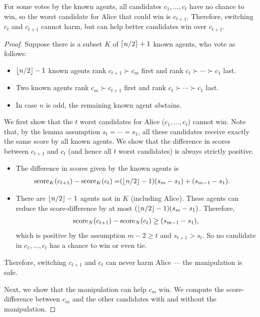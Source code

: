 \begin{proofsketch}
For some votes by the known agents,
all candidates $c_1,\ldots,c_t$ have no chance to win, 
so the worst candidate for Alice that could win is $c_{t+1}$.
Therefore, switching $c_t$ and $c_{t+1}$ cannot harm, but can help better candidates win over $c_{t+1}$.
\end{proofsketch}
\begin{proof}
Suppose there is a subset $K$ of $\left\lceil n/2 \right\rceil+1$ known agents, who vote as follows:
\begin{itemize}
\item $\left\lfloor n/2 \right\rfloor-1$ known agents rank $c_{t+1} \succ c_m$ first and rank $c_t \succ \cdots \succ c_1$ last.
\item Two known agents rank $c_m \succ c_{t+1}$ first and rank $c_t \succ \cdots \succ c_1$ last.
\item In case $n$ is odd, the remaining known agent abstains.
\end{itemize}
We first show that the $t$ worst candidates for Alice ($c_1,\ldots, c_t$) cannot win. 
Note that, by the lemma assumption $s_t = \cdots = s_1$, all these candidates receive exactly the same score by all known agents. We show that the difference in scores between $c_{t+1}$ and $c_t$ (and hence all $t$ worst candidates) is always strictly positive.
\begin{itemize}
\item The difference in scores given by the known agents is 
\begin{align*}
\operatorname{score}_K(c_{t+1})-\operatorname{score}_K(c_t) =
&
(\left\lfloor n/2 \right\rfloor-1)(s_m-s_1) 
+ (s_{m-1}-s_1).
\end{align*}
\item There are
$\left\lfloor n/2 \right\rfloor-1$ agents not in $K$ (including Alice).
These agents can reduce the score-difference by at most 
$(\left\lfloor n/2 \right\rfloor-1)(s_m-s_1)$.
Therefore, 
\begin{align*}
\operatorname{score}_N(c_{t+1})-\operatorname{score}_N(c_t) \geq (s_{m-1}-s_1),
\end{align*}
which is positive 
by the assumption $m-2 \geq t$ and $s_{t+1}>s_t$.
So no candidate in $c_1,\ldots,c_t$ has a chance to win or even tie.
\end{itemize}
Therefore, switching $c_{t+1}$ and $c_t$ can never harm Alice --- the manipulation is safe.

Next, we show that the manipulation can help $c_m$ win. We compute the score-difference between $c_m$ and the other candidates with and without the manipulation. 


\end{proof}
